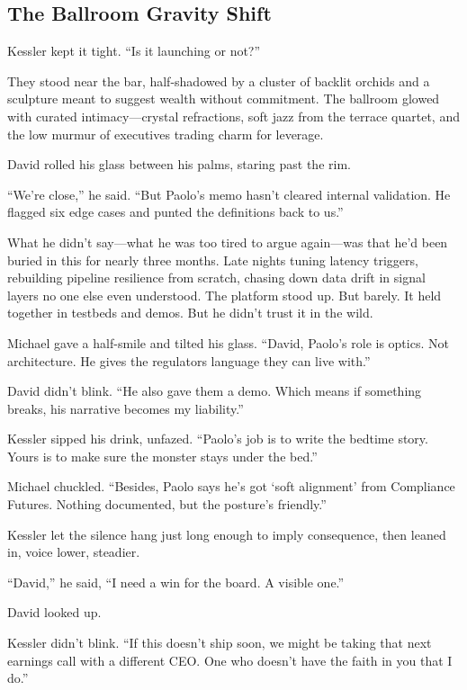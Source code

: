 \subsection{The Ballroom Gravity Shift}

Kessler kept it tight. ``Is it launching or not?''

They stood near the bar, half-shadowed by a cluster of backlit orchids and a sculpture meant to 
suggest wealth without commitment. The ballroom glowed with curated intimacy—crystal refractions, 
soft jazz from the terrace quartet, and the low murmur of executives trading charm for leverage.

David rolled his glass between his palms, staring past the rim.

``We’re close,'' he said. ``But Paolo’s memo hasn’t cleared internal validation. He flagged six 
edge cases and punted the definitions back to us.''

What he didn’t say—what he was too tired to argue again—was that he’d been buried in this for 
nearly three months. Late nights tuning latency triggers, rebuilding pipeline resilience from 
scratch, chasing down data drift in signal layers no one else even understood. The platform 
stood up. But barely. It held together in testbeds and demos. But he didn’t trust it in the wild.

Michael gave a half-smile and tilted his glass. ``David, Paolo’s role is optics. Not architecture. 
He gives the regulators language they can live with.''

David didn’t blink. ``He also gave them a demo. Which means if something breaks, his narrative 
becomes my liability.''

Kessler sipped his drink, unfazed. ``Paolo’s job is to write the bedtime story. Yours is to 
make sure the monster stays under the bed.''


Michael chuckled. ``Besides, Paolo says he’s got ‘soft alignment’ from Compliance Futures. 
Nothing documented, but the posture’s friendly.''

Kessler let the silence hang just long enough to imply consequence, then leaned in, voice lower, steadier.

``David,'' he said, ``I need a win for the board. A visible one.''

David looked up.

Kessler didn’t blink. ``If this doesn’t ship soon, we might be taking that next earnings call with a 
different CEO. One who doesn’t have the faith in you that I do.''

